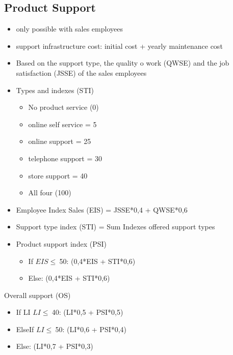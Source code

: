 \subsection{Product Support}
\begin{itemize}
\item only possible with sales employees 
\item support infrastructure cost: initial cost + yearly maintenance cost  
\item Based on the support type, the quality o work (QWSE) and the job satisfaction (JSSE) of the sales employees
\item Types and indexes (STI)
\begin{itemize}
\item No product service (0)
\item online self service = 5
\item online support = 25
\item telephone support = 30  
\item store support = 40
\item All four (100)
\end{itemize}
\item Employee Index Sales (EIS) = JSSE*0,4 + QWSE*0,6
\item Support type index (STI) = Sum Indexes offered support types
\item Product support index (PSI) 
\begin{itemize}
\item If $EIS \leq \ $50: (0,4*EIS + STI*0,6)
\item Else: (0,4*EIS + STI*0,6)
\end{itemize}
\end{itemize}

Overall support (OS)
\begin{itemize}
\item If LI $LI \leq \ $40: (LI*0,5 + PSI*0,5)
\item ElseIf $LI \leq \ $50: (LI*0,6 + PSI*0,4)
\item Else: (LI*0,7 + PSI*0,3)
\end{itemize}